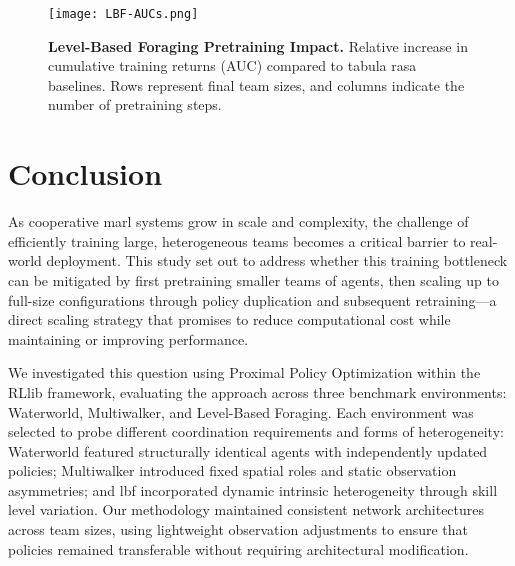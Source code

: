 \documentclass{article}
\begin{document}
\begin{figure}[ht]
    \centering
    \texttt{[image: LBF-AUCs.png]}
    \caption{\textbf{Level-Based Foraging Pretraining Impact.} 
    Relative increase in cumulative training returns (AUC) compared to tabula rasa baselines. 
    Rows represent final team sizes, and columns indicate the number of pretraining steps.}
    \label{con1:fig:lbf-aucs}
\end{figure}

\FloatBarrier


\section{Conclusion}

As cooperative \gls{marl} systems grow in scale and complexity, the challenge of efficiently 
training large, heterogeneous teams becomes a critical barrier to real-world deployment. 
This study set out to address whether this training bottleneck can be mitigated by 
first pretraining smaller teams of agents, then scaling up to full-size configurations 
through policy duplication and subsequent retraining—a direct scaling strategy that 
promises to reduce computational cost while maintaining or improving performance.

We investigated this question using Proximal Policy Optimization within the 
RLlib framework, evaluating the approach across three benchmark environments: 
Waterworld, Multiwalker, and Level-Based Foraging. Each environment was 
selected to probe different coordination requirements and forms of heterogeneity: 
Waterworld featured structurally identical agents with independently updated policies; 
Multiwalker introduced fixed spatial roles and static observation asymmetries; 
and \gls{lbf} incorporated dynamic intrinsic heterogeneity through 
skill level variation. Our methodology maintained consistent network architectures across 
team sizes, using lightweight observation adjustments to ensure that policies remained 
transferable without requiring architectural modification.
\end{document}
